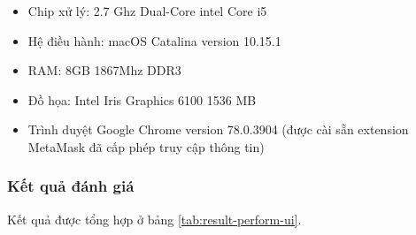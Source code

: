 \documentclass[../main-report.tex]{subfiles}
\begin{document}
\begin{itemize}
\item Chip xử lý: 2.7 Ghz Dual-Core intel Core i5
\item Hệ điều hành: macOS Catalina version 10.15.1
\item RAM: 8GB 1867Mhz DDR3
\item Đồ họa: Intel Iris Graphics 6100 1536 MB
\item Trình duyệt Google Chrome version 78.0.3904 (được cài sẵn extension MetaMask đã cấp phép truy cập thông tin)
\end{itemize}
\subsubsection{Kết quả đánh giá}
Kết quả được tổng hợp ở bảng \ref{tab:result-perform-ui}.

\begin{table}[!ht]
\centering
{}
\caption{Bảng kết quả đo tốc độ truy xuất front-end của hệ thống}
\label{tab:result-perform-ui}
\end{table}
\end{document}
